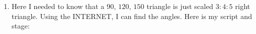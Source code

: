 \documentclass{ximera}
\begin{document}
\begin{question}
\begin{freeResponse}
\begin{enumerate}
    \item Here I needed to know that a $90$, $120$, $150$ triangle is
      just scaled $3:4:5$ right triangle. Using the INTERNET, I can
      find the angles.  Here is my script and stage:
      \begin{center}
        \qquad
      \end{center}
    \end{enumerate}
  \end{freeResponse}
\end{question}
\end{document}
